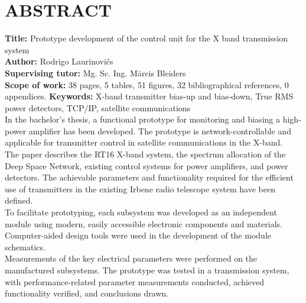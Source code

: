 \chapter*{ABSTRACT}
\begin{flushleft}
\textbf{Title:} Prototype development of the control unit for the X band transmission system\\
\textbf{Author:} Rodrigo Laurinovičs\\
\textbf{Supervising tutor:} Mg. Sc. Ing. Mārcis Bleiders\\
\textbf{Scope of work:} 38 pages, 5 tables, 51 figures, 32 bibliographical references, 0 appendices.
\textbf{Keywords:} X-band transmitter bias-up and bias-down, True RMS power detectors, TCP/IP, satellite communications
\\In the bachelor's thesis, a functional prototype for monitoring and biasing a high-power amplifier has been developed. The prototype is network-controllable and applicable for transmitter control in satellite communications in the X-band.\\

The paper describes the RT16 X-band system, the spectrum allocation of the Deep Space Network, existing control systems for power amplifiers, and power detectors. The achievable parameters and functionality required for the efficient use of transmitters in the existing Irbene radio telescope system have been defined.\\

To facilitate prototyping, each subsystem was developed as an independent module using modern, easily accessible electronic components and materials. Computer-aided design tools were used in the development of the module schematics.\\

Measurements of the key electrical parameters were performed on the manufactured subsystems. The prototype was tested in a transmission system, with performance-related parameter measurements conducted, achieved functionality verified, and conclusions drawn.
\end{flushleft}
